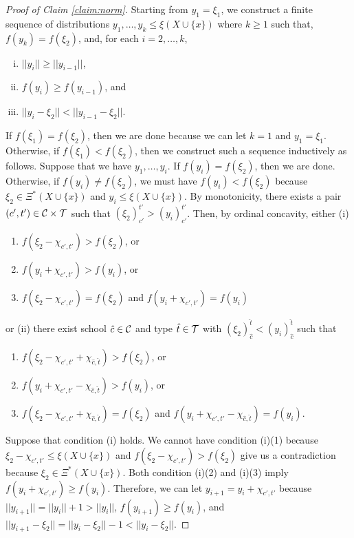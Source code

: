 \documentclass[12pt]{amsart}
\theoremstyle{remark}
\newcommand{\norm}[1]{|| #1 ||}
\begin{document}
\begin{proof}[Proof of Claim \ref{claim:norm}]\renewcommand{\qedsymbol}{$\blacksquare$}
Starting from $y_1=\xi_1$, we construct a finite sequence of distributions $y_1,\ldots,y_k\leq \xi(X\cup \{x\})$
where $k\geq 1$ such that, $f(y_k)=f(\xi_2)$, and, for each $i=2,\ldots,k$,
\begin{enumerate}[(i)]
  \item $\norm{y_i}\geq \norm{y_{i-1}}$,
  \item $f(y_i) \geq f(y_{i-1})$, and
  \item $\norm{y_i-\xi_2} < \norm{y_{i-1}-\xi_2}$.
\end{enumerate}

If $f(\xi_1)=f(\xi_2)$, then we are done because we can let $k=1$ and $y_1=\xi_1$.
Otherwise, if $f(\xi_1)<f(\xi_2)$, then we construct such a sequence inductively
as follows. Suppose that we have $y_1, \ldots, y_i$. If $f(y_i)=f(\xi_2)$,
then we are done. Otherwise, if $f(y_i)\neq f(\xi_2)$,
we must have $f(y_i)<f(\xi_2)$ because $\xi_2\in \Xi^*(X\cup \{x\})$
and $y_i\leq \xi(X\cup \{x\})$. By monotonicity, there exists a pair
$(c',t')\in \mathcal{C} \times \mathcal{T}$ such that $(\xi_2)_{c'}^{t'}>(y_i)_{c'}^{t'}$.
Then, by ordinal concavity,
either (i)
\begin{enumerate}
\item $f(\xi_2-\chi_{c',t'})>f(\xi_2)$, or
\item $f(y_i+\chi_{c',t'})>f(y_i)$, or
\item $f(\xi_2-\chi_{c',t'})=f(\xi_2)$ and $f(y_i+\chi_{c',t'})=f(y_i)$
\end{enumerate}
or (ii) there exist school $\hat c\in \mathcal{C}$ and type $\hat t\in \mathcal{T}$  with
$(\xi_2)_{\hat c}^{\hat t}<(y_i)_{\hat c}^{\hat t}$ such that
\begin{enumerate}
\item $f(\xi_2-\chi_{c',t'}+\chi_{\hat c, \hat t})>f(\xi_2)$, or
\item $f(y_i+\chi_{c',t'}-\chi_{\hat c, \hat t})>f(y_i)$, or
\item $f(\xi_2-\chi_{c',t'}+\chi_{\hat c, \hat t})=f(\xi_2)$ and $f(y_i+\chi_{c',t'}-\chi_{\hat c, \hat t}) = f(y_i)$.
\end{enumerate}

Suppose that condition (i) holds. We cannot have condition (i)(1) because $\xi_2-\chi_{c',t'}\leq \xi(X\cup\{x\})$ and $f(\xi_2-\chi_{c',t'})>f(\xi_2)$ give us a contradiction because $\xi_2\in \Xi^*(X\cup \{x\})$.
Both condition (i)(2) and (i)(3) imply $f(y_i+\chi_{c',t'})\geq f(y_i)$.
Therefore, we can let $y_{i+1}=y_i+\chi_{c',t'}$
because $\norm{y_{i+1}}=\norm{y_i} +1 > \norm{y_i}$, $f(y_{i+1}) \geq f(y_{i})$, and
$\norm{y_{i+1}-\xi_2}=\norm{y_i-\xi_2}-1 < \norm{y_i-\xi_2}$.


\end{proof}
\end{document}
